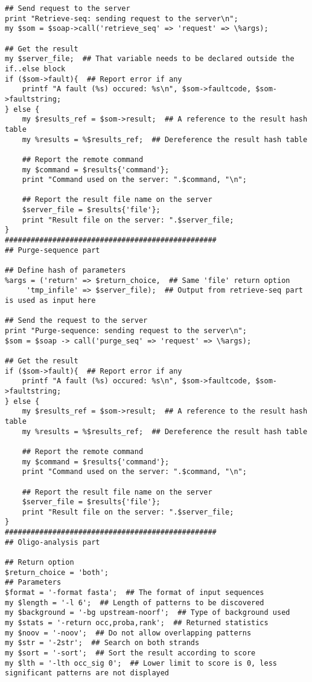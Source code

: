\begin{footnotesize}
\begin{verbatim}
## Send request to the server
print "Retrieve-seq: sending request to the server\n";
my $som = $soap->call('retrieve_seq' => 'request' => \%args);

## Get the result
my $server_file;  ## That variable needs to be declared outside the if..else block
if ($som->fault){  ## Report error if any
    printf "A fault (%s) occured: %s\n", $som->faultcode, $som->faultstring;
} else {
    my $results_ref = $som->result;  ## A reference to the result hash table
    my %results = %$results_ref;  ## Dereference the result hash table
    
    ## Report the remote command
    my $command = $results{'command'};
    print "Command used on the server: ".$command, "\n";
    
    ## Report the result file name on the server
    $server_file = $results{'file'};
    print "Result file on the server: ".$server_file;
}
#################################################
## Purge-sequence part

## Define hash of parameters
%args = ('return' => $return_choice,  ## Same 'file' return option
	 'tmp_infile' => $server_file);  ## Output from retrieve-seq part is used as input here

## Send the request to the server
print "Purge-sequence: sending request to the server\n";
$som = $soap -> call('purge_seq' => 'request' => \%args);

## Get the result
if ($som->fault){  ## Report error if any
    printf "A fault (%s) occured: %s\n", $som->faultcode, $som->faultstring;
} else {
    my $results_ref = $som->result;  ## A reference to the result hash table
    my %results = %$results_ref;  ## Dereference the result hash table
    
    ## Report the remote command
    my $command = $results{'command'};
    print "Command used on the server: ".$command, "\n";

    ## Report the result file name on the server
    $server_file = $results{'file'};
    print "Result file on the server: ".$server_file;
}
#################################################
## Oligo-analysis part

## Return option
$return_choice = 'both';
## Parameters
$format = '-format fasta';  ## The format of input sequences
my $length = '-l 6';  ## Length of patterns to be discovered
my $background = '-bg upstream-noorf';  ## Type of background used
my $stats = '-return occ,proba,rank';  ## Returned statistics
my $noov = '-noov';  ## Do not allow overlapping patterns
my $str = '-2str';  ## Search on both strands
my $sort = '-sort';  ## Sort the result according to score
my $lth = '-lth occ_sig 0';  ## Lower limit to score is 0, less significant patterns are not displayed


\end{verbatim}
\end{footnotesize}
